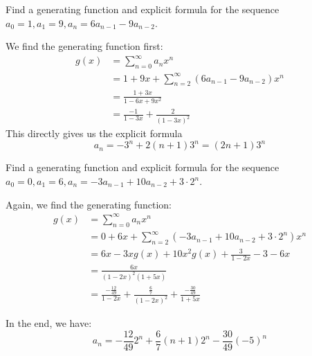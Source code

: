 \documentclass[11pt,twosided]{article}
\begin{document}
\begin{problem}
	Find a generating function and explicit formula for the sequence $a_0 = 1, a_1 = 9, a_n = 6a_{n-1} - 9a_{n-2}$. 
\end{problem}

\begin{solution}
We find the generating function first: 
\begin{align*}
	g(x) &= \sum_{n=0}^\infty a_n x^n \\
	&= 1 + 9x + \sum_{n=2}^\infty (6a_{n-1} - 9a_{n-2}) x^n \\
	&= \frac{1+3x}{1-6x+9x^2} \\
	&= \frac{-1}{1-3x} + \frac{2}{(1-3x)^2}
\end{align*}
This directly gives us the explicit formula \[
	a_n = -3^n + 2(n+1) 3^n = (2n+1)3^n 
\]
\end{solution}

\begin{problem}
	Find a generating function and explicit formula for the sequence $a_0 = 0, a_1 = 6, a_n = -3a_{n-1} + 10a_{n-2} + 3\cdot 2^n $. 
\end{problem}

\begin{solution}
Again, we find the generating function: 
\begin{align*}
	g(x) &= \sum_{n=0}^\infty a_n x^n \\
	&= 0 + 6x + \sum_{n=2}^\infty (-3a_{n-1} + 10a_{n-2} + 3\cdot 2^n) x^n \\
	&= 6x -3x g(x) + 10x^2 g(x) + \frac{3}{1-2x} - 3 - 6x \\
	&= \frac{6x}{(1-2x)^2(1+5x)}\\
	&= \frac{-\frac{12}{49}}{1-2x} + \frac{\frac{6}{7}}{(1-2x)^2} + \frac{-\frac{30}{49}}{1+5x}
\end{align*}

In the end, we have:
\[
	a_n = -\frac{12}{49} 2^n + \frac{6}{7}(n+1)2^n -\frac{30}{49} (-5)^n 
\]

\end{solution}
\end{document}
